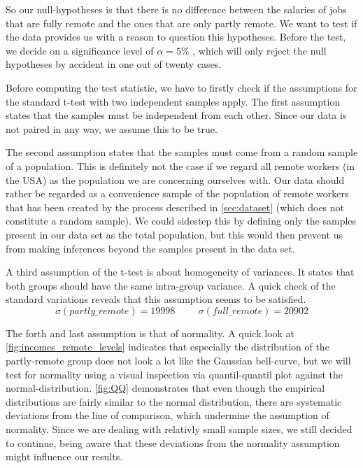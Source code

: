 \documentclass{article}
\begin{document}
So our null-hypotheses is that there is no difference between the salaries of jobs that are fully remote and the ones that are only partly remote. We want to test if the data provides us with a reason to question this hypotheses. Before the test, we decide on a significance level of $\alpha=5\%$  
, which will only reject the null hypotheses by accident in one out of twenty cases. 

Before computing the test statistic, we have to firstly check if the assumptions for the standard t-test with two independent samples apply. The first assumption states that the samples must be independent from each other. Since our data is not paired in any way, we assume this to be true. 

The second assumption states that the samples must come from a random sample of a population. This is definitely not the case if we regard all remote workers (in the USA) as the population we are concerning ourselves with. Our data should rather be regarded as a convenience sample of the population of remote workers that has been created by the process described in \autoref{sec:dataset} (which does not constitute a random sample). We could sidestep this by defining only the samples present in our data set as the total population, but this would then prevent us from making inferences beyond the samples present in the data set. 

A third assumption of the t-test is about homogeneity of variances. It states that both groups should have the same intra-group variance. A quick check of the standard variations reveals that this assumption seems to be satisfied. 
$$\sigma(partly\_remote)=19998 \hspace{1cm} \sigma(full\_remote)=20902$$

The forth and last assumption is that of normality. A quick look at  \autoref{fig:incomes_remote_levels} indicates that especially the distribution of the partly-remote group does not look a lot like the Gaussian bell-curve, but we will test for normality using a visual inspection via quantil-quantil plot against the normal-distribution.  \autoref{fig:QQ} demonstrates that even though the empirical distributions are fairly similar to the normal distribution, there are systematic deviations from the line of comparison, which undermine the assumption of normality. Since we are dealing with relativly small sample sizes, we still decided to continue, being aware that these deviations from the normality assumption might influence our results.
\end{document}
